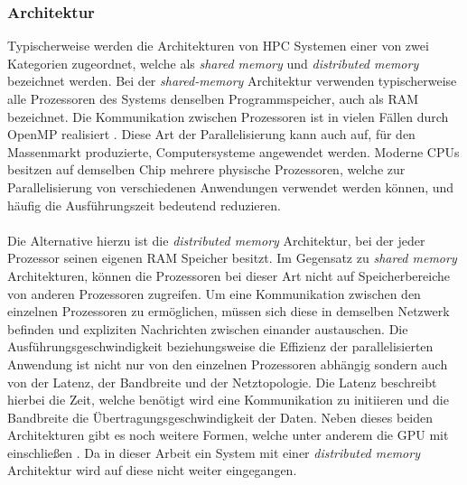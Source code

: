 \subsubsection{Architektur}
\label{subsubsec:hpc_architecture}
Typischerweise werden die Architekturen von \ac{HPC} Systemen einer von zwei Kategorien zugeordnet, welche als \emph{shared memory} und \emph{distributed memory} bezeichnet werden. Bei der \emph{shared-memory} Architektur verwenden typischerweise alle Prozessoren des Systems denselben Programmspeicher, auch als \ac{RAM} bezeichnet. Die Kommunikation zwischen Prozessoren ist in vielen Fällen durch \ac{OpenMP} realisiert \cite{nielsen2016introduction}. Diese Art der Parallelisierung kann auch auf, für den Massenmarkt produzierte, Computersysteme angewendet werden. Moderne \acp{CPU} besitzen auf demselben Chip mehrere physische Prozessoren, welche zur Parallelisierung von verschiedenen Anwendungen verwendet werden können, und häufig die Ausführungszeit bedeutend reduzieren. 
\\\\
Die Alternative hierzu ist die \emph{distributed memory} Architektur, bei der jeder Prozessor seinen eigenen \ac{RAM} Speicher besitzt. Im Gegensatz zu \emph{shared memory} Architekturen, können die Prozessoren bei dieser Art nicht auf Speicherbereiche von anderen Prozessoren zugreifen. Um eine Kommunikation zwischen den einzelnen Prozessoren zu ermöglichen, müssen sich diese in demselben Netzwerk befinden und expliziten Nachrichten zwischen einander austauschen. Die Ausführungsgeschwindigkeit beziehungsweise die Effizienz der parallelisierten Anwendung ist nicht nur von den einzelnen Prozessoren abhängig sondern auch von der Latenz, der Bandbreite und der Netztopologie. Die Latenz beschreibt hierbei die Zeit, welche benötigt wird eine Kommunikation zu initiieren und die Bandbreite die Übertragungsgeschwindigkeit der Daten. Neben dieses beiden Architekturen gibt es noch weitere Formen, welche unter anderem die \ac{GPU} mit einschließen \cite{nielsen2016introduction}. Da in dieser Arbeit ein System mit einer \emph{distributed memory} Architektur wird auf diese nicht weiter eingegangen.

